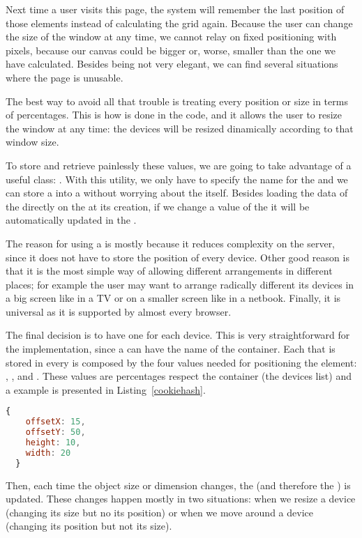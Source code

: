 Next time a user visits this page, the system will remember the last position of those elements instead of calculating the grid again.
Because the user can change the size of the window at any time, we cannot relay on fixed positioning with pixels, because our canvas could be bigger or, worse, smaller than the one we have calculated.
Besides being not very elegant, we can find several situations where the page is unusable.

The best way to avoid all that trouble is treating every position or size in terms of percentages.
This is how is done in the code, and it allows the user to resize the window at any time: the devices will be resized dinamically according to that window size.

To store and retrieve painlessly these values, we are going to take advantage of a useful  class:  \cite{MooHashCookie}.
With this utility, we only have to specify the name for the  and we can store a  into a  without worrying about the  itself.
Besides loading the data of the  directly on the  at its creation, if we change a value of the  it will be automatically updated in the .

The reason for using a  is mostly because it reduces complexity on the server, since it does not have to store the position of every device.
Other good reason is that it is the most simple way of allowing different arrangements in different places; for example the user may want to arrange radically different its devices in a big screen like in a TV or on a smaller screen like in a netbook.
Finally, it is universal as it is supported by almost every browser.

The final decision is to have one  for each device.
This is very straightforward for the implementation, since a  can
have the name of the container.
Each  that is stored in every  is composed by the four
values needed for positioning the element: , ,
 and .
These values are percentages respect the container (the devices list) and a
 example is presented in Listing~\ref{cookiehash}.

\begin{lstlisting}[language=JavaScript,label=cookiehash,caption=Cookie Hash example]
  {
    offsetX: 15,
    offsetY: 50,
    height: 10,
    width: 20
  }
\end{lstlisting}

Then, each time the object size or dimension changes, the  (and therefore the ) is updated.
These changes happen mostly in two situations: when we resize a device (changing its size but no its position) or when we move around a device (changing its position but not its size).
